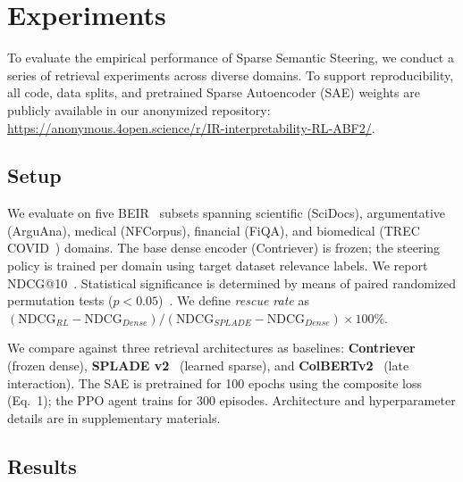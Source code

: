 \documentclass[sigconf]{acmart}
\begin{document}
\section{Experiments}

To evaluate the empirical performance of Sparse Semantic Steering, we conduct a series of retrieval experiments across diverse domains. To support reproducibility, all code, data splits, and pretrained Sparse Autoencoder (SAE) weights are publicly available in our anonymized repository: \url{https://anonymous.4open.science/r/IR-interpretability-RL-ABF2/}.

\subsection{Setup}

We evaluate on five BEIR~\cite{thakur2021} subsets spanning scientific (SciDocs), argumentative (ArguAna), medical (NFCorpus), financial (FiQA), and biomedical (TREC COVID~\cite{voorhees2021}) domains. The base dense encoder (Contriever) is frozen; the steering policy is trained per domain using target dataset relevance labels. We report NDCG@10~\cite{jarvelin2002}. Statistical significance is determined by means of paired randomized permutation tests ($p < 0.05$)~\cite{smucker2007}. We define \textit{rescue rate} as $(\text{NDCG}_{RL} - \text{NDCG}_{Dense}) / (\text{NDCG}_{SPLADE} - \text{NDCG}_{Dense}) \times 100\%$.

We compare against three retrieval architectures as baselines: \textbf{Contriever}~\cite{izacard2022} (frozen dense), \textbf{SPLADE v2}~\cite{formal2021spladev2} (learned sparse), and \textbf{ColBERTv2}~\cite{santhanam2022} (late interaction). The SAE is pretrained for 100 epochs using the composite loss (Eq.~1); the PPO agent trains for 300 episodes. Architecture and hyperparameter details are in supplementary materials.

\subsection{Results}
\end{document}
